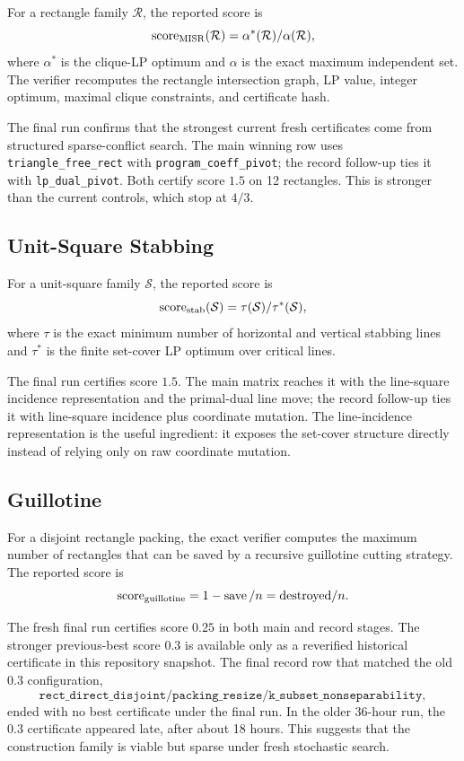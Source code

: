 \documentclass[11pt]{article}
\newcommand{\code}[1]{\texttt{#1}}
\newcommand{\Rcal}{\mathcal{R}}
\newcommand{\Scal}{\mathcal{S}}
\newcommand{\score}{\operatorname{score}}
\newcommand{\save}{\operatorname{save}}
\begin{document}
For a rectangle family $\Rcal$, the reported score is
\[
        \score_{\rm MISR}(\Rcal)=\alpha^*(\Rcal)/\alpha(\Rcal),
\]
where $\alpha^*$ is the clique-LP optimum and $\alpha$ is the exact maximum
independent set.  The verifier recomputes the rectangle intersection graph,
LP value, integer optimum, maximal clique constraints, and certificate hash.

The final run confirms that the strongest current fresh certificates come from
structured sparse-conflict search.  The main winning row uses
\code{triangle\_free\_rect} with \code{program\_coeff\_pivot}; the record
follow-up ties it with \code{lp\_dual\_pivot}.  Both certify score $1.5$ on
12 rectangles.  This is stronger than the current controls, which stop at
$4/3$.

\subsection{Unit-Square Stabbing}

For a unit-square family $\Scal$, the reported score is
\[
        \score_{\rm stab}(\Scal)=\tau(\Scal)/\tau^*(\Scal),
\]
where $\tau$ is the exact minimum number of horizontal and vertical stabbing
lines and $\tau^*$ is the finite set-cover LP optimum over critical lines.

The final run certifies score $1.5$.  The main matrix reaches it with the
line-square incidence representation and the primal-dual line move; the record
follow-up ties it with line-square incidence plus coordinate mutation.  The
line-incidence representation is the useful ingredient: it exposes the
set-cover structure directly instead of relying only on raw coordinate
mutation.

\subsection{Guillotine}

For a disjoint rectangle packing, the exact verifier computes the maximum
number of rectangles that can be saved by a recursive guillotine cutting
strategy.  The reported score is
\[
        \score_{\rm guillotine}=1-\save/n
        =\text{destroyed}/n.
\]

The fresh final run certifies score $0.25$ in both main and record stages.
The stronger previous-best score $0.3$ is available only as a reverified
historical certificate in this repository snapshot.  The final record row that
matched the old $0.3$ configuration,
\[
\code{rect\_direct\_disjoint/packing\_resize/k\_subset\_nonseparability},
\]
ended with no best certificate under the final run.  In the older 36-hour run,
the $0.3$ certificate appeared late, after about 18 hours.  This suggests that
the construction family is viable but sparse under fresh stochastic search.
\end{document}
